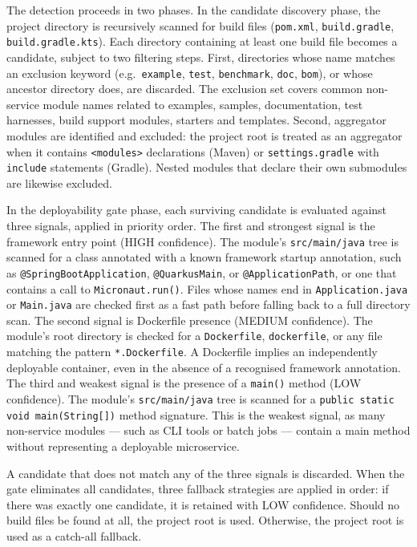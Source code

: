 The detection proceeds in two phases. In the candidate discovery phase, the project directory is recursively scanned for build files (\texttt{pom.xml}, \texttt{build.gradle}, \texttt{build\-.gradle\-.kts}). Each directory containing at least one build file becomes a candidate, subject to two filtering steps. First, directories whose name matches an exclusion keyword (e.g.\ \texttt{example}, \texttt{test}, \texttt{benchmark}, \texttt{doc}, \texttt{bom}), or whose ancestor directory does, are discarded. The exclusion set covers common non-service module names related to examples, samples, documentation, test harnesses, build support modules, starters and templates. Second, aggregator modules are identified and excluded: the project root is treated as an aggregator when it contains \texttt{<modules>} declarations (Maven) or \texttt{settings.gradle} with \texttt{include} statements (Gradle). Nested modules that declare their own submodules are likewise excluded.

In the deployability gate phase, each surviving candidate is evaluated against three signals, applied in priority order.
The first and strongest signal is the framework entry point (HIGH confidence). The module's \texttt{src/main/java} tree is scanned for a class annotated with a known framework startup annotation, such as \texttt{@Spring\-Boot\-Application}, \texttt{@QuarkusMain}, or \texttt{@ApplicationPath}, or one that contains a call to \texttt{Micronaut.run()}. Files whose names end in \texttt{Application.java} or \texttt{Main.java} are checked first as a fast path before falling back to a full directory scan.
The second signal is Dockerfile presence (MEDIUM confidence). The module's root directory is checked for a \texttt{Dockerfile}, \texttt{dockerfile}, or any file matching the pattern \texttt{*.Dockerfile}. A Dockerfile implies an independently deployable container, even in the absence of a recognised framework annotation.
The third and weakest signal is the presence of a \texttt{main()} method (LOW confidence). The module's \texttt{src/main/java} tree is scanned for a \texttt{public static void main(String[])} method signature. This is the weakest signal, as many non-service modules — such as CLI tools or batch jobs — contain a main method without representing a deployable microservice.

A candidate that does not match any of the three signals is discarded. When the gate eliminates all candidates, three fallback strategies are applied in order: if there was exactly one candidate, it is retained with LOW confidence. Should no build files be found at all, the project root is used. Otherwise, the project root is used as a catch-all fallback.

